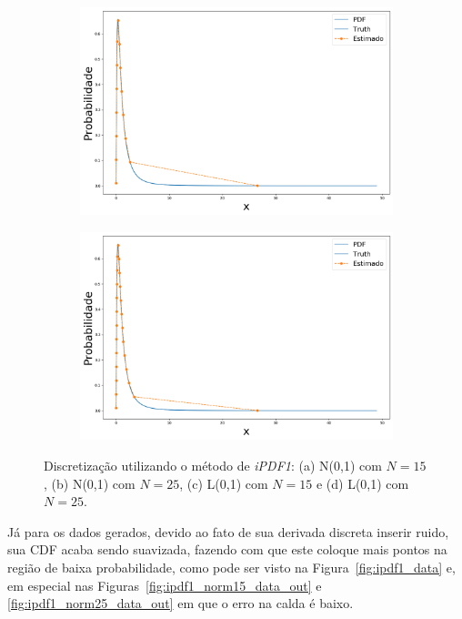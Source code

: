 \begin{figure}[H]
	\begin{subfigure}[b]{0.45\textwidth}
		\centering 
		\includegraphics[width=\linewidth]{./figuras/iPDF1_lognormal_15}
		\caption{}
		\label{fig:ipdflognorm15}
	\end{subfigure}
	\hfill
	\begin{subfigure}[b]{0.45\textwidth}
		\centering 
		\includegraphics[width=\linewidth]{./figuras/iPDF1_lognormal_25}
		\caption{}
		\label{fig:ipdflognorm25}
	\end{subfigure}
	
	\caption{Discretização utilizando o método de \textit{iPDF1}: (a) N(0,1) com $N = 15$, (b) N(0,1) com $N = 25$, (c) L(0,1) com $N = 15$ e (d) L(0,1) com $N = 25$.}
	\label{fig:ipdfmnorm}
\end{figure}

Já para os dados gerados, devido ao fato de sua derivada discreta inserir ruido, sua CDF acaba sendo suavizada, fazendo com que este coloque mais pontos na região de baixa probabilidade, como pode ser visto na Figura~\ref{fig:ipdf1_data} e, em especial nas Figuras~\ref{fig:ipdf1_norm15_data_out} e \ref{fig:ipdf1_norm25_data_out} em que o erro na calda é baixo.

